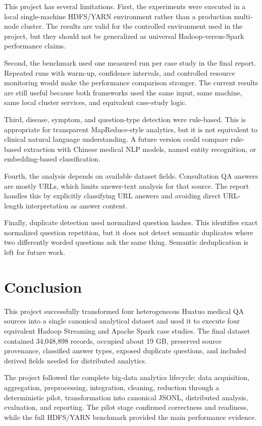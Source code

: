 \documentclass[12pt,a4paper]{article}
\let\oldsection\section
\renewcommand{\section}{\clearpage\oldsection}
\begin{document}
This project has several limitations. First, the experiments were executed in a local single-machine HDFS/YARN environment rather than a production multi-node cluster. The results are valid for the controlled environment used in the project, but they should not be generalized as universal Hadoop-versus-Spark performance claims.

Second, the benchmark used one measured run per case study in the final report. Repeated runs with warm-up, confidence intervals, and controlled resource monitoring would make the performance comparison stronger. The current results are still useful because both frameworks used the same input, same machine, same local cluster services, and equivalent case-study logic.

Third, disease, symptom, and question-type detection were rule-based. This is appropriate for transparent MapReduce-style analytics, but it is not equivalent to clinical natural language understanding. A future version could compare rule-based extraction with Chinese medical NLP models, named entity recognition, or embedding-based classification.

Fourth, the analysis depends on available dataset fields. Consultation QA answers are mostly URLs, which limits answer-text analysis for that source. The report handles this by explicitly classifying URL answers and avoiding direct URL-length interpretation as answer content.

Finally, duplicate detection used normalized question hashes. This identifies exact normalized question repetition, but it does not detect semantic duplicates where two differently worded questions ask the same thing. Semantic deduplication is left for future work.

\section{Conclusion}

This project successfully transformed four heterogeneous Huatuo medical QA sources into a single canonical analytical dataset and used it to execute four equivalent Hadoop Streaming and Apache Spark case studies. The final dataset contained 34,048,898 records, occupied about 19 GB, preserved source provenance, classified answer types, exposed duplicate questions, and included derived fields needed for distributed analytics.

The project followed the complete big-data analytics lifecycle: data acquisition, aggregation, preprocessing, integration, cleaning, reduction through a deterministic pilot, transformation into canonical JSONL, distributed analysis, evaluation, and reporting. The pilot stage confirmed correctness and readiness, while the full HDFS/YARN benchmark provided the main performance evidence.
\end{document}
